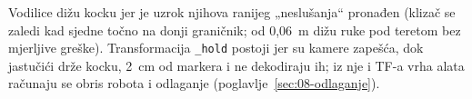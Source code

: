Vodilice dižu kocku jer je uzrok njihova ranijeg „neslušanja“ pronađen (klizač se zaledi kad sjedne
točno na donji graničnik; od 0{,}06~m dižu ruke pod teretom bez mjerljive greške). Transformacija
\texttt{\_hold} postoji jer su kamere zapešća, dok jastučići drže kocku, 2~cm od markera i ne dekodiraju
ih; iz nje i TF-a vrha alata računaju se obris robota i odlaganje (poglavlje~\ref{sec:08-odlaganje}).

